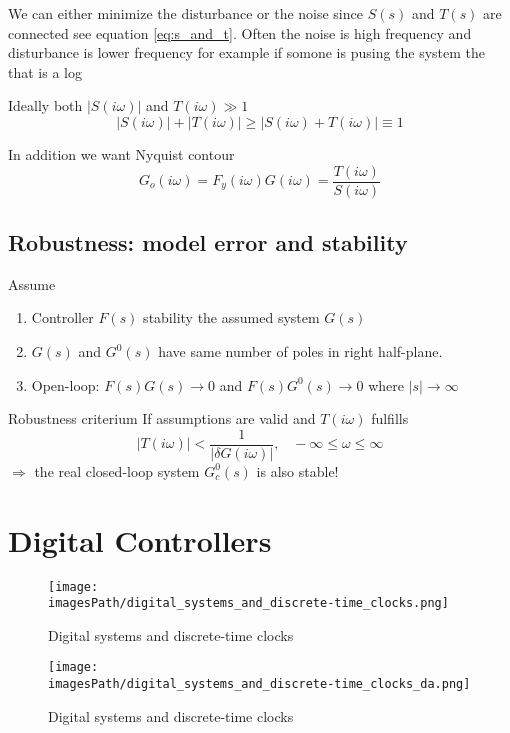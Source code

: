 \documentclass{article}
\newcommand{\imagesPath}{images}
\begin{document}
We can either minimize the disturbance or the noise since $S(s)$ and $T(s)$ are connected
see equation \ref{eq:s_and_t}. Often the noise is high frequency and disturbance is lower
frequency for example if somone is pusing the system the that is a log

Ideally both $|S(i\omega)|$ and $T(i\omega) \gg 1$ 
\begin{equation*}
    |S(i\omega)| + |T(i\omega)| \geq |S(i\omega) + T(i\omega)| \equiv 1
\end{equation*}

In addition we want Nyquist contour
\begin{equation*}
    G_o(i\omega) = F_y(i\omega)G(i\omega) = \frac{T(i\omega)}{S(i\omega)}
\end{equation*}

\subsection{Robustness: model error and stability}
Assume
\begin{enumerate}
    \item Controller $F(s)$ stability the assumed system $G(s)$
    \item $G(s)$ and $G^0(s)$ have same number of poles in right half-plane.
    \item Open-loop: $F(s)G(s)\to0$ and $F(s)G^0(s)\to0$ where $|s|\to\infty$
\end{enumerate}

Robustness criterium 
If assumptions are valid and $T(i\omega)$ fulfills
\begin{equation*}
    |T(i\omega)| < \frac{1}{|\delta G(i\omega)|}, \;\;\; -\infty\leq\omega\leq\infty
\end{equation*}
$\Rightarrow$ the real closed-loop system $G^0_c(s)$ is also stable!


\section{Digital Controllers}
\begin{figure}[!h]
    \centering
    \texttt{[image: \\imagesPath/digital\_systems\_and\_discrete-time\_clocks.png]}
    \caption{Digital systems and discrete-time clocks}
\end{figure}

\begin{figure}[!h]
    \centering
    \texttt{[image: \\imagesPath/digital\_systems\_and\_discrete-time\_clocks\_da.png]}
    \caption{Digital systems and discrete-time clocks}
\end{figure}
\end{document}
